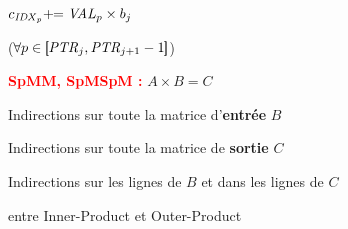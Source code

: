\begin{frame}
    \medskip

     \parbox[t]{3cm}{$c_{\mathit{IDX}_p} +\!\!= \mathit{VAL}_p \times b_j$} \hfill \textcolor{black!50}{($\forall p \in [\!\![ \mathit{PTR}_j, \mathit{PTR}_{j+1}-1 ]\!\!]$)}

    \bigskip\bigskip

    \pause[3]%
    \textbf{\textcolor{Red}{SpMM, SpMSpM :}} $A \times B = C$

    \medskip

     Indirections sur toute la matrice d'\textbf{entrée} $B$

    \medskip

     Indirections sur toute la matrice de \textbf{sortie} $C$

    \medskip

     Indirections sur les lignes de $B$ et dans les lignes de $C$

     entre Inner-Product et Outer-Product

\end{frame}

